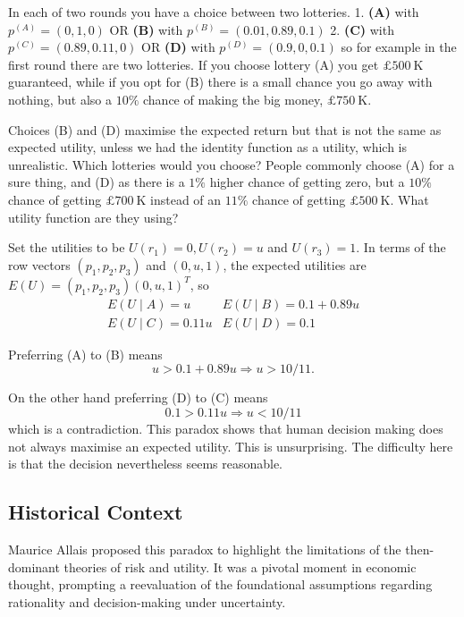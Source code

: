\documentclass{article}
\begin{document}
In each of two rounds you have a choice between two lotteries.
1. \textbf{(A)} with $p^{(A)}=(0,1,0)$ OR\textbf{ (B) }with $p^{(B)}=(0.01,0.89,0.1)$
2. \textbf{(C)} with $p^{(C)}=(0.89,0.11,0)$ OR \textbf{(D) }with $p^{(D)}=(0.9,0,0.1)$
so for example in the first round there are two lotteries. If you choose lottery (A) you get $£ 500 \mathrm{~K}$ guaranteed, while if you opt for (B) there is a small chance you go away with nothing, but also a $10 \%$ chance of making the big money, $£ 750 \mathrm{~K}$.

Choices (B) and (D) maximise the expected return but that is not the same as expected utility, unless we had the identity function as a utility, which is unrealistic. Which lotteries would you choose? People commonly choose (A) for a sure thing, and (D) as there is a $1 \%$ higher chance of getting zero, but a $10 \%$ chance of getting $£ 700 \mathrm{~K}$ instead of an $11 \%$ chance of getting $£ 500 \mathrm{~K}$. What utility function are they using?

Set the utilities to be $U\left(r_1\right)=0, U\left(r_2\right)=u$ and $U\left(r_3\right)=1$. In terms of the row vectors $\left(p_1, p_2, p_3\right)$ and $(0, u, 1)$, the expected utilities are $E(U)=\left(p_1, p_2, p_3\right)(0, u, 1)^T$, so
$$
\begin{array}{ll}
E(U \mid A)=u & E(U \mid B)=0.1+0.89 u \\
E(U \mid C)=0.11 u & E(U \mid D)=0.1
\end{array}
$$

Preferring (A) to (B) means
$$
u>0.1+0.89 u \Rightarrow u>10 / 11 .
$$

On the other hand preferring (D) to (C) means
$$
0.1>0.11 u \Rightarrow u<10 / 11
$$
which is a contradiction. This paradox shows that human decision making does not always maximise an expected utility. This is unsurprising. The difficulty here is that the decision nevertheless seems reasonable.

\subsection{Historical Context}
Maurice Allais proposed this paradox to highlight the limitations of the then-dominant theories of risk and utility. It was a pivotal moment in economic thought, prompting a reevaluation of the foundational assumptions regarding rationality and decision-making under uncertainty.
\end{document}
